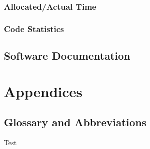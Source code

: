 \documentclass[a4paper,parskip=full]{scrreprt}
\begin{document}
\section{Allocated/Actual Time}
\section{Code Statistics}

\chapter{Software Documentation}


\part{Appendices}

\chapter{Glossary and Abbreviations}

Test \citep{yapproach}

\renewcommand{\bibname}{\chapter{Literature and Sources}}


\end{document}

